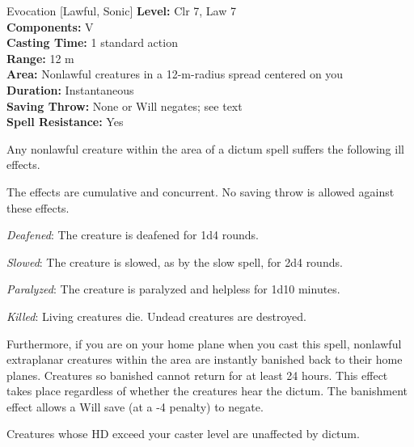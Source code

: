 {Evocation [Lawful, Sonic]}
{
	\textbf{Level:}
	Clr 7, Law 7\\
	\textbf{Components:}
	V\\
	\textbf{Casting Time:}
	1 standard action\\
	\textbf{Range:}
	12 m\\
	\textbf{Area:}
	Nonlawful creatures in a 12-m-radius spread centered on you\\
	\textbf{Duration:}
	Instantaneous\\
	\textbf{Saving Throw:}
	None or Will negates; see text\\
	\textbf{Spell Resistance:}
	Yes\\
}
{
	Any nonlawful creature within the area of a dictum spell suffers the following ill effects.

	The effects are cumulative and concurrent. No saving throw is allowed against these effects.

	\textit{Deafened}:
	The creature is deafened for 1d4 rounds.

	\textit{Slowed}:
	The creature is slowed, as by the slow spell, for 2d4 rounds.

	\textit{Paralyzed}:
	The creature is paralyzed and helpless for 1d10 minutes.

	\textit{Killed}:
	Living creatures die. Undead creatures are destroyed.

	Furthermore, if you are on your home plane when you cast this spell, nonlawful extraplanar creatures within the area are instantly banished back to their home planes. Creatures so banished cannot return for at least 24 hours. This effect takes place regardless of whether the creatures hear the dictum. The banishment effect allows a Will save (at a -4 penalty) to negate.

	Creatures whose HD exceed your caster level are unaffected by dictum.

}
